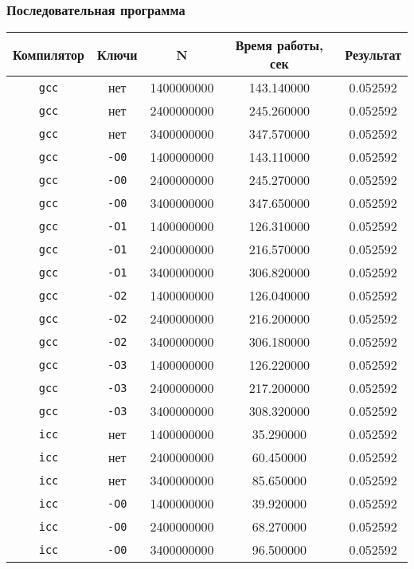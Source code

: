 \documentclass[a4paper,12pt]{article}
\begin{document}
\subsubsection{Последовательная программа}
\begin{tabular}{c | c | c c c}
\textbf{Компилятор} & \textbf{Ключи} & \textbf{N} & \textbf{Время работы, сек} & \textbf{Результат}\\
\hline
\texttt{gcc} & нет & 1400000000 & 143.140000 & 0.052592\\
\texttt{gcc} & нет & 2400000000 & 245.260000 & 0.052592\\
\texttt{gcc} & нет & 3400000000 & 347.570000 & 0.052592\\
\hline
\texttt{gcc} & \texttt{-O0} & 1400000000 & 143.110000 & 0.052592\\
\texttt{gcc} & \texttt{-O0} & 2400000000 & 245.270000 & 0.052592\\
\texttt{gcc} & \texttt{-O0} & 3400000000 & 347.650000 & 0.052592\\
\hline
\texttt{gcc} & \texttt{-O1} & 1400000000 & 126.310000 & 0.052592\\
\texttt{gcc} & \texttt{-O1} & 2400000000 & 216.570000 & 0.052592\\
\texttt{gcc} & \texttt{-O1} & 3400000000 & 306.820000 & 0.052592\\
\hline
\texttt{gcc} & \texttt{-O2} & 1400000000 & 126.040000 & 0.052592\\
\texttt{gcc} & \texttt{-O2} & 2400000000 & 216.200000 & 0.052592\\
\texttt{gcc} & \texttt{-O2} & 3400000000 & 306.180000 & 0.052592\\
\hline
\texttt{gcc} & \texttt{-O3} & 1400000000 & 126.220000 & 0.052592\\
\texttt{gcc} & \texttt{-O3} & 2400000000 & 217.200000 & 0.052592\\
\texttt{gcc} & \texttt{-O3} & 3400000000 & 308.320000 & 0.052592\\
\hline
\hline
\texttt{icc} & нет & 1400000000 & 35.290000 & 0.052592\\
\texttt{icc} & нет & 2400000000 & 60.450000 & 0.052592\\
\texttt{icc} & нет & 3400000000 & 85.650000 & 0.052592\\
\hline
\texttt{icc} & \texttt{-O0} & 1400000000 & 39.920000 & 0.052592\\
\texttt{icc} & \texttt{-O0} & 2400000000 & 68.270000 & 0.052592\\
\texttt{icc} & \texttt{-O0} & 3400000000 & 96.500000 & 0.052592\\

\end{tabular}
\end{document}
